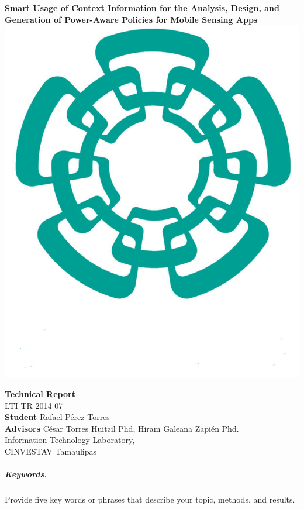 \documentclass[12pt]{article}
\numberwithin{equation}{section}
\numberwithin{table}{section}
\numberwithin{figure}{section}
\begin{document}

\begin{center}
\textbf{\Large Smart Usage of Context Information for the Analysis, Design, and Generation of Power-Aware Policies for Mobile Sensing Apps} \\[16pt]

\includegraphics[scale=0.08]{cinvestav2.jpg}

\textbf{Technical Report}\\[6pt]
LTI-TR-2014-07 \\[16pt]

\textbf{Student} Rafael Pérez-Torres \\[6pt]
\textbf{Advisors} César Torres Huitzil Phd, Hiram Galeana Zapién Phd.\\[16pt]

Information Technology Laboratory,\\
CINVESTAV Tamaulipas \\[16pt]

\end{center}



\subparagraph{Keywords.} Provide five key words or phrases that
describe your topic, methods, and results.















\end{document}
